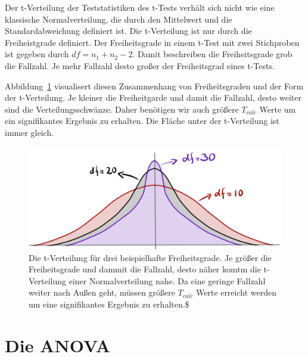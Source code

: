 \documentclass[
  letterpaper,
  DIV=11,
  oneside]{scrreport}
\begin{document}
Der t-Verteilung der Teststatistiken des t-Tests verhält sich nicht wie
eine klassische Normalverteilung, die durch den Mittelwert und die
Standardabweichung definiert ist. Die t-Verteilung ist nur durch die
Freiheistgrade definiert. Der Freiheitsgrade in einem t-Test mit zwei
Stichproben ist gegeben durch \(df = n_1 + n_2 -2\). Damit beschreiben
die Freiheitsgrade grob die Fallzahl. Je mehr Fallzahl desto großer der
Freiheitsgrad eines t-Tests.

Abbildung~\ref{fig-ttest-06} visualisert diesen Zusammenhang von
Freiheitsgraden und der Form der t-Verteilung. Je kleiner die
Freiheitgarde und damit die Fallzahl, desto weiter sind die
Verteilungsschwänze. Daher benötigen wir auch größere \(T_{calc}\) Werte
um ein signifikantes Ergebnis zu erhalten. Die Fläche unter der
t-Verteilung ist immer gleich.

\begin{figure}

{\centering \includegraphics{./images/t-verteilung_06.png}

}

\caption{\label{fig-ttest-06}Die t-Verteilung für drei beispielhafte
Freiheitsgrade. Je größer die Freiheitsgrade und dammit die Fallzahl,
desto näher komtm die t-Verteilung einer Normalverteilung nahe. Da eine
geringe Fallzahl weiter nach Außen geht, müssen größere \(T_{calc}\)
Werte erreicht werden um eine signifikantes Ergebnis zu erhalten.\$}

\end{figure}

\hypertarget{sec-anova}{%
\chapter{Die ANOVA}\label{sec-anova}}

{}
\end{document}
